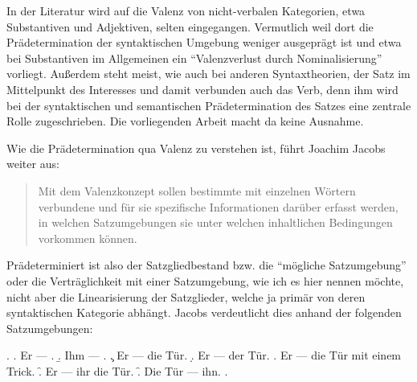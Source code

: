 In der Literatur wird auf die Valenz von nicht-verbalen Kategorien, etwa Substantiven und Adjektiven, selten eingegangen. Vermutlich weil dort die Prädetermination der syntaktischen Umgebung weniger ausgeprägt ist und etwa bei Substantiven im Allgemeinen ein "`Valenzverlust durch Nominalisierung"' \citep[61]{Agel:00} vorliegt. Außerdem steht meist, wie auch bei anderen Syntaxtheorien, der Satz im Mittelpunkt des Interesses und damit verbunden auch das Verb, denn ihm wird bei der syntaktischen und semantischen Prädetermination des Satzes eine zentrale Rolle zugeschrieben. Die vorliegenden Arbeit macht da keine Ausnahme.

Wie die Prädetermination qua Valenz zu verstehen ist, führt Joachim Jacobs weiter aus:
\begin{quote}
Mit dem Valenzkonzept sollen bestimmte mit einzelnen Wörtern verbundene und für sie spezifische Informationen darüber erfasst werden, in welchen Satzumgebungen sie unter welchen inhaltlichen Bedingungen vorkommen können. \cite[378]{Jacobs:03}
\end{quote}
Prädeterminiert ist also der Satzgliedbestand bzw. die "`mögliche Satzumgebung"' \cite[378]{Jacobs:03} oder die Verträglichkeit mit einer Satzumgebung, wie ich es hier nennen möchte, nicht aber die Linearisierung der Satzglieder, welche ja primär von deren syntaktischen Kategorie abhängt. Jacobs verdeutlicht dies anhand der folgenden Satzumgebungen:

\ex. \label{ex-valenz-1}
\a. \label{ex-valenz-1-a} Er --- .
\b. \label{ex-valenz-1-b} Ihm --- .
\c. \label{ex-valenz-1-c} Er --- die Tür.
\d. \label{ex-valenz-1-d} Er --- der Tür.
\e. \label{ex-valenz-1-e} Er --- die Tür mit einem Trick.
\f. \label{ex-valenz-1-f} Er --- ihr die Tür.
\f. \label{ex-valenz-1-g} Die Tür --- ihn.
\z. \cite[(1)]{Jacobs:03}  

